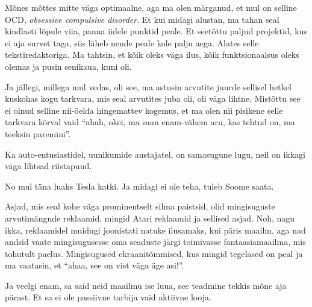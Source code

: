 Mõnes mõttes mitte väga optimaalne, aga ma olen märganud, et mul on selline OCD, \emph{obsessive compulsive disorder}. Et kui midagi alustan, ma tahan seal kindlasti lõpule viia, panna iidele punktid peale. Et seetõttu paljud projektid, kus ei aja survet taga, siis läheb nende peale kole palju aega. Alates selle tekstiredaktoriga. Ma tahtsin, et kõik oleks väga ilus, kõik funktsionaalsus oleks olemas ja pusin senikaua, kuni oli. 


Ja jällegi, millega mul vedas, oli see, ma astusin arvutite juurde sellisel hetkel kuskohas kogu tarkvara, mis seal arvutites juba oli, oli väga lihtne. Mistõttu see ei olnud selline nii-öelda hingemattev kogemus, et ma olen nii pisikene selle tarkvara kõrval vaid \enquote{ahah, okei, ma saan enam-vähem aru, kas tehtud on, ma teeksin paremini}.


Ka auto-entusiastidel, uunikumide austajatel, on samasugune lugu, neil on ikkagi väga lihtsad riistapuud.


No mul täna luaks Tesla katki. Ja midagi ei ole teha, tuleb Soome saata.


Asjad, mis seal kohe väga prominentselt silma paistsid, olid mingisuguste arvutimängude reklaamid, mingid Atari reklaamid ja sellised asjad. Noh, nagu ikka, reklaamidel muidugi joonistati natuke ilusamaks, kui päris maailm, aga nad andsid vaate mingisugusesse oma seaduste järgi toimivasse fantaasiamaailma, mis tohutult paelus. Mingisugused ekraanitõmmised, kus mingid tegelased on peal ja ma vaatasin, et \enquote{ahaa, see on vist väga äge asi!}.


Ja veelgi enam, sa said neid maailmu ise luua, see teadmine tekkis mõne aja pärast. Et sa ei ole passiivne tarbija vaid aktiivne looja.


